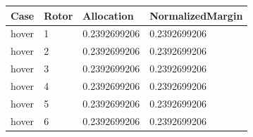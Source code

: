 \begin{tabular}{@{}llll@{}}
\toprule
Case & Rotor & Allocation & NormalizedMargin \\
\midrule
hover & 1 & 0.2392699206 & 0.2392699206 \\
hover & 2 & 0.2392699206 & 0.2392699206 \\
hover & 3 & 0.2392699206 & 0.2392699206 \\
hover & 4 & 0.2392699206 & 0.2392699206 \\
hover & 5 & 0.2392699206 & 0.2392699206 \\
hover & 6 & 0.2392699206 & 0.2392699206 \\
\bottomrule
\end{tabular}
